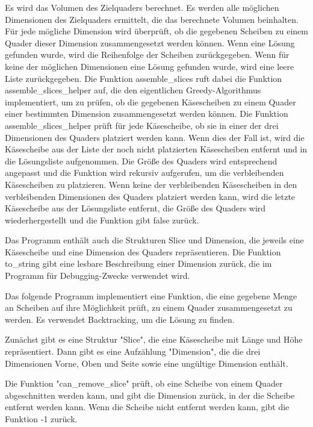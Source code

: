 \documentclass[a4paper,10pt,ngerman]{scrartcl}
\begin{document}
    Es wird das Volumen des Zielquaders berechnet.
    Es werden alle möglichen Dimensionen des Zielquaders ermittelt, die das berechnete Volumen beinhalten.
    Für jede mögliche Dimension wird überprüft, ob die gegebenen Scheiben zu einem Quader dieser Dimension zusammengesetzt werden können.
    Wenn eine Lösung gefunden wurde, wird die Reihenfolge der Scheiben zurückgegeben.
    Wenn für keine der möglichen Dimensionen eine Lösung gefunden wurde, wird eine leere Liste zurückgegeben.
    Die Funktion assemble_slices ruft dabei die Funktion assemble_slices_helper auf, die den eigentlichen Greedy-Algorithmus implementiert,
    um zu prüfen, ob die gegebenen Käsescheiben zu einem Quader einer bestimmten Dimension zusammengesetzt werden können.
    Die Funktion assemble_slices_helper prüft für jede Käsescheibe, ob sie in einer der drei Dimensionen des Quaders platziert werden kann.
    Wenn dies der Fall ist, wird die Käsescheibe aus der Liste der noch nicht platzierten Käsescheiben entfernt und in die Lösungsliste aufgenommen.
    Die Größe des Quaders wird entsprechend angepasst und die Funktion wird rekursiv aufgerufen, um die verbleibenden Käsescheiben zu platzieren.
    Wenn keine der verbleibenden Käsescheiben in den verbleibenden Dimensionen des Quaders platziert werden kann, wird die letzte Käsescheibe aus der Lösungsliste entfernt, die Größe des Quaders wird wiederhergestellt und die Funktion gibt false zurück.

    Das Programm enthält auch die Strukturen Slice und Dimension, die jeweils eine Käsescheibe und eine Dimension des Quaders repräsentieren.
    Die Funktion to_string gibt eine lesbare Beschreibung einer Dimension zurück, die im Programm für Debugging-Zwecke verwendet wird.

    Das folgende Programm implementiert eine Funktion, die eine gegebene Menge an Scheiben auf ihre Möglichkeit prüft, zu einem Quader zusammengesetzt zu werden.
    Es verwendet Backtracking, um die Lösung zu finden.

    Zunächst gibt es eine Struktur "Slice", die eine Käsescheibe mit Länge und Höhe repräsentiert.
    Dann gibt es eine Aufzählung "Dimension", die die drei Dimensionen Vorne, Oben und Seite sowie eine ungültige Dimension enthält.

    Die Funktion "can_remove_slice" prüft, ob eine Scheibe von einem Quader abgeschnitten werden kann, und gibt die Dimension zurück, in der die Scheibe entfernt werden kann.
    Wenn die Scheibe nicht entfernt werden kann, gibt die Funktion -1 zurück.
\end{document}

